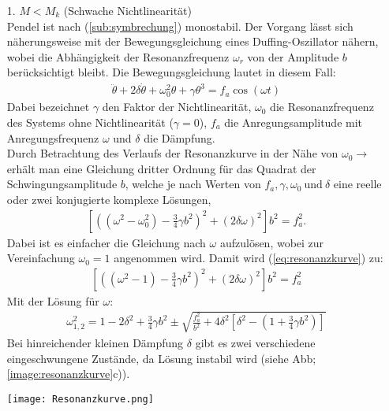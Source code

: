 \begin{itemize}
    \item[1.] $M<M_k$ (Schwache Nichtlinearität)\\
    Pendel ist nach (\ref{sub:symbrechung}) monostabil. Der Vorgang lässt sich näherungsweise mit der Bewegungsgleichung eines Duffing-Oszillator nähern, wobei die Abhängigkeit der Resonanzfrequenz $\omega_r$ von der Amplitude $b$ berücksichtigt bleibt. Die Bewegungsgleichung lautet in diesem Fall:
    \begin{gather}
        \ddot{\theta} + 2\delta\dot{\theta} + \omega_0^2\theta + \gamma\theta^3 = f_a\cos(\omega t)
    \end{gather}
    Dabei bezeichnet $\gamma$ den Faktor der Nichtlinearität, $\omega_0$ die Resonanzfrequenz des Systems ohne Nichtlinearität ($\gamma=0$), $f_a$ die Anregungsamplitude mit Anregungsfrequenz $\omega$ und $\delta$ die Dämpfung.\\
    Durch Betrachtung des Verlaufs der Resonanzkurve in der Nähe von $\omega_0 \rightarrow$ erhält man eine Gleichung dritter Ordnung für das Quadrat der Schwingungsamplitude $b$, welche je nach Werten von $f_a, \gamma, \omega_0~\text{und}~\delta$ eine reelle oder zwei konjugierte komplexe Lösungen,
    \begin{gather}
        \left[\left((\omega^2-\omega_0^2) - \frac{3}{4}\gamma b^2\right)^2+(2\delta\omega)^2\right]b^2=f_a^2. %
        \label{eq:resonanzkurve}
    \end{gather}
    Dabei ist es einfacher die Gleichung nach $\omega$ aufzulösen, wobei zur Vereinfachung $\omega_0=1$ angenommen wird. Damit wird (\ref{eq:resonanzkurve}) zu:
    \begin{gather}
        \left[\left((\omega^2-1) - \frac{3}{4}\gamma b^2\right)^2+(2\delta\omega)^2\right]b^2=f_a^2
    \end{gather}
    Mit der Lösung für $\omega$:
    \begin{gather}
        \omega^2_{1,2} = 1 - 2\delta^2 + \frac{3}{4}\gamma b^2 \pm \sqrt{\frac{f_a^2}{b^2}+ 4\delta^2\left[\delta^2 - \left(1 + \frac{3}{4}\gamma b^2\right)\right]}
    \end{gather}
    Bei hinreichender kleinen Dämpfung $\delta$ gibt es zwei verschiedene eingeschwungene Zustände, da Lösung instabil wird (siehe Abb; \ref{image:resonanzkurve}c)).
    \begin{center}
        \texttt{[image: Resonanzkurve.png]}

\end{center}
\end{itemize}
